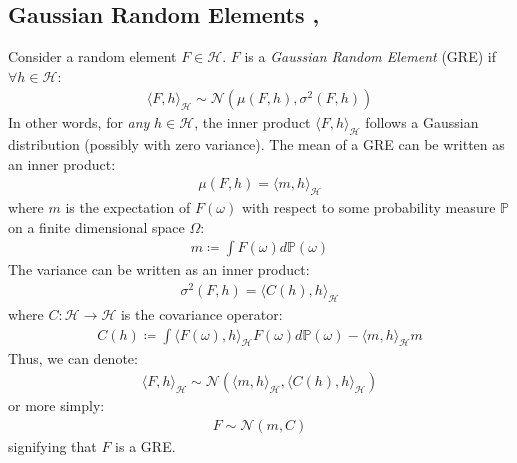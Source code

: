\documentclass[twoside,11pt]{article}
\begin{document}
\subsection{Gaussian Random Elements \cite{wild2022generalized}, \cite{Kukush_2019}}
 Consider a random element $F \in \mathcal{H}$. $F$ is a \textit{Gaussian Random Element} (GRE) if $\forall h \in \mathcal{H}$:
\begin{align}
    \langle F, h \rangle_\mathcal{H} \sim \mathcal{N}(\mu(F, h), \sigma^2(F, h))
\end{align}
In other words, for \textit{any} $h \in \mathcal{H}$, the inner product $\langle F, h \rangle_\mathcal{H}$ follows a Gaussian distribution (possibly with zero variance). The mean of a GRE can be written as an inner product:
\begin{align}
\mu(F, h) = \langle m, h\rangle_{\mathcal{H}}
\end{align}
where $m$ is the expectation of $F(\omega)$ with respect to some probability measure $\mathbb{P}$ on a finite dimensional space $\Omega$:
\begin{align}
    \label{gm-mean}
    m \coloneqq \int F(\omega) d \mathbb{P}(\omega)
\end{align}
The variance can be written as an inner product:
\begin{align}
\sigma^2(F, h) = \langle C(h), h\rangle_{\mathcal{H}}
\end{align}
where $C: \mathcal{H} \rightarrow \mathcal{H}$ is the covariance operator:
\begin{align}
    \label{gm-covariance}
    C(h) \coloneqq \int \langle F(\omega), h\rangle_{\mathcal{H}} F(\omega)d \mathbb{P}(\omega) - \langle m, h\rangle_{\mathcal{H}} m 
\end{align}
Thus, we can denote:
\begin{align}
    \langle F, h\rangle_{\mathcal{H}} \sim \mathcal{N}\left(  \langle m, h\rangle_{\mathcal{H}},  \langle C(h), h\rangle_{\mathcal{H}}\right)
\end{align}
or more simply:
\begin{align}
    F \sim \mathcal{N}(m, C)
\end{align}
signifying that $F$ is a GRE.
\end{document}
